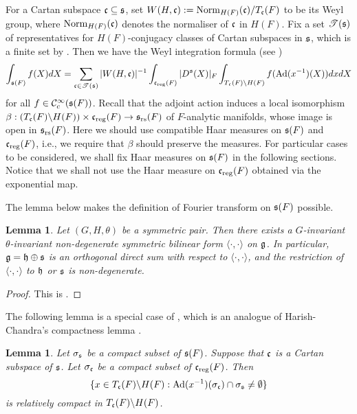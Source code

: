 \documentclass[a4paper]{amsart}
\newtheorem{lem}[thm]{Lemma}
\theoremstyle{definition}
\theoremstyle{remark}
\numberwithin{equation}{subsection}
\begin{document}
For a Cartan subspace ${\mathfrak{c}}\subseteq{\mathfrak{s}}$, set $W(H, {\mathfrak{c}}):={\mathrm{Norm}}_{H(F)}({\mathfrak{c}})/T_{\mathfrak{c}}(F)$ to be its Weyl group, where ${\mathrm{Norm}}_{H(F)}({\mathfrak{c}})$ denotes the normaliser of ${\mathfrak{c}}$ in $H(F)$. Fix a set $\mathscr{T}({\mathfrak{s}})$ of representatives for $H(F)$-conjugacy classes of Cartan subspaces in ${\mathfrak{s}}$, which is a finite set by \cite[p. 105]{MR1375304}. Then we have the Weyl integration formula (see \cite[p. 106]{MR1375304})
\begin{equation}\label{wif}
 \int_{{\mathfrak{s}}(F)} f(X) dX=\sum_{{\mathfrak{c}}\in\mathscr{T}({\mathfrak{s}})} |W(H, {\mathfrak{c}})|^{-1} \int_{{\mathfrak{c}}_{\mathrm{reg}}(F)} |D^{\mathfrak{s}}(X)|_F \int_{T_{\mathfrak{c}}(F)\backslash H(F)} f({\mathrm{Ad}}(x^{-1})(X)) dx dX 
\end{equation}
for all $f\in{\mathcal {C}}_c^\infty({\mathfrak{s}}(F))$. Recall that the adjoint action induces a local isomorphism $\beta: (T_{\mathfrak{c}}(F)\backslash H(F))\times{\mathfrak{c}}_{\mathrm{reg}}(F)\rightarrow{\mathfrak{s}}_{\mathrm{rs}}(F)$ of $F$-analytic manifolds, whose image is open in ${\mathfrak{s}}_{\mathrm{rs}}(F)$. Here we should use compatible Haar measures on ${\mathfrak{s}}(F)$ and ${\mathfrak{c}}_{\mathrm{reg}}(F)$, i.e., we require that $\beta$ should preserve the measures. For particular cases to be considered, we shall fix Haar measures on ${\mathfrak{s}}(F)$ in the following sections. Notice that we shall not use the Haar measure on ${\mathfrak{c}}_{\mathrm{reg}}(F)$ obtained via the exponential map. 

The lemma below makes the definition of Fourier transform on ${\mathfrak{s}}(F)$ possible. 

\begin{lem}
Let $(G,H,\theta)$ be a symmetric pair. Then there exists a $G$-invariant $\theta$-invariant non-degenerate symmetric bilinear form $\langle\cdot,\cdot\rangle$ on ${\mathfrak{g}}$. In particular, ${\mathfrak{g}}={\mathfrak{h}}\oplus{\mathfrak{s}}$ is an orthogonal direct sum with respect to $\langle\cdot,\cdot\rangle$, and the restriction of $\langle\cdot,\cdot\rangle$ to ${\mathfrak{h}}$ or ${\mathfrak{s}}$ is non-degenerate. 
\end{lem}

\begin{proof}
This is \cite[Lemma 7.1.9]{MR2553879}. 
\end{proof}

The following lemma is a special case of \cite[Lemma 3.10]{MR3245011}, which is an analogue of Harish-Chandra's compactness lemma \cite[Lemma 25]{MR0414797}. 

\begin{lem}\label{lem25}
Let $\sigma_{\mathfrak{s}}$ be a compact subset of ${\mathfrak{s}}(F)$. Suppose that ${\mathfrak{c}}$ is a Cartan subspace of ${\mathfrak{s}}$. Let $\sigma_{\mathfrak{c}}$ be a compact subset of ${\mathfrak{c}}_{\mathrm{reg}}(F)$. Then
$$ \{x\in T_{\mathfrak{c}}(F)\backslash H(F): {\mathrm{Ad}}(x^{-1})(\sigma_{\mathfrak{c}})\cap\sigma_{\mathfrak{s}}\neq\emptyset\} $$
is relatively compact in $T_{\mathfrak{c}}(F)\backslash H(F)$. 
\end{lem}
\end{document}

